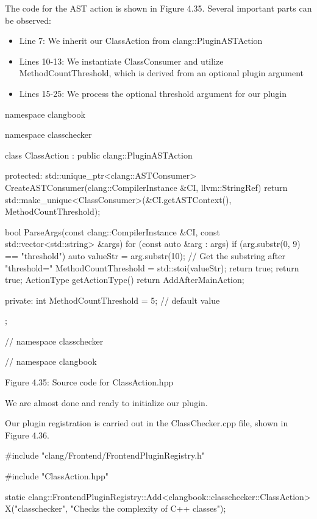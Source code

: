 
The code for the AST action is shown in Figure 4.35. Several important parts can be observed:

\begin{itemize}
\item
Line 7: We inherit our ClassAction from clang::PluginASTAction

\item
Lines 10-13: We instantiate ClassConsumer and utilize MethodCountThreshold, which is derived from an optional plugin argument

\item
Lines 15-25: We process the optional threshold argument for our plugin
\end{itemize}

\begin{cpp}
namespace clangbook {
namespace classchecker {
class ClassAction : public clang::PluginASTAction {
protected:
  std::unique_ptr<clang::ASTConsumer>
  CreateASTConsumer(clang::CompilerInstance &CI, llvm::StringRef) {
    return std::make_unique<ClassConsumer>(&CI.getASTContext(),
                                           MethodCountThreshold);
  }

  bool ParseArgs(const clang::CompilerInstance &CI,
    const std::vector<std::string> &args) {
      for (const auto &arg : args) {
        if (arg.substr(0, 9) == "threshold") {
          auto valueStr = arg.substr(10); // Get the substring after "threshold="
          MethodCountThreshold = std::stoi(valueStr);
          return true;
        }
      }
    return true;
  }
  ActionType getActionType() { return AddAfterMainAction; }

private:
  int MethodCountThreshold = 5; // default value
};
} // namespace classchecker
} // namespace clangbook
\end{cpp}

\begin{center}
Figure 4.35: Source code for ClassAction.hpp
\end{center}

We are almost done and ready to initialize our plugin.


Our plugin registration is carried out in the ClassChecker.cpp file, shown in Figure 4.36.

\begin{cpp}
#include "clang/Frontend/FrontendPluginRegistry.h"

#include "ClassAction.hpp"

static clang::FrontendPluginRegistry::Add<clangbook::classchecker::ClassAction>
X("classchecker", "Checks the complexity of C++ classes");
\end{cpp}


